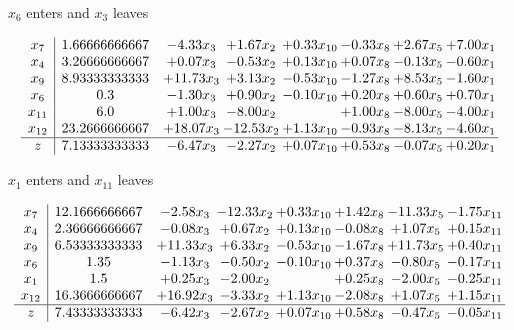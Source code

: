 \documentclass[8pt]{article}
\begin{document}
 $ x_{6} $ enters and $ x_{3} $ leaves 

 \[\begin{array}{c| c c@{\hskip 2pt} c@{\hskip 2pt} c@{\hskip 2pt} c@{\hskip 2pt} c@{\hskip 2pt} c@{\hskip 2pt} }
 x_{7}   &  1.66666666667 & -4.33 x_{3} & +  1.67 x_{2} & +  0.33 x_{10} & -0.33 x_{8} & +  2.67 x_{5} & +  7.00 x_{1}\\
 x_{4}   &  3.26666666667 & +  0.07 x_{3} & -0.53 x_{2} & +  0.13 x_{10} & +  0.07 x_{8} & -0.13 x_{5} & -0.60 x_{1}\\
 x_{9}   &  8.93333333333 & + 11.73 x_{3} & +  3.13 x_{2} & -0.53 x_{10} & -1.27 x_{8} & +  8.53 x_{5} & -1.60 x_{1}\\
 x_{6}   &  0.3 & -1.30 x_{3} & +  0.90 x_{2} & -0.10 x_{10} & +  0.20 x_{8} & +  0.60 x_{5} & +  0.70 x_{1}\\
 x_{11}   &  6.0 & +  1.00 x_{3} & -8.00 x_{2} &   & +  1.00 x_{8} & -8.00 x_{5} & -4.00 x_{1}\\
 x_{12}   &  23.2666666667 & + 18.07 x_{3} & -12.53 x_{2} & +  1.13 x_{10} & -0.93 x_{8} & -8.13 x_{5} & -4.60 x_{1}\\
\hline
z    &  7.13333333333 & -6.47 x_{3} & -2.27 x_{2} & +  0.07 x_{10} & +  0.53 x_{8} & -0.07 x_{5} & +  0.20 x_{1}\\
\end{array}\]


 $ x_{1} $ enters and $ x_{11} $ leaves 

 \[\begin{array}{c| c c@{\hskip 2pt} c@{\hskip 2pt} c@{\hskip 2pt} c@{\hskip 2pt} c@{\hskip 2pt} c@{\hskip 2pt} }
 x_{7}   &  12.1666666667 & -2.58 x_{3} & -12.33 x_{2} & +  0.33 x_{10} & +  1.42 x_{8} & -11.33 x_{5} & -1.75 x_{11}\\
 x_{4}   &  2.36666666667 & -0.08 x_{3} & +  0.67 x_{2} & +  0.13 x_{10} & -0.08 x_{8} & +  1.07 x_{5} & +  0.15 x_{11}\\
 x_{9}   &  6.53333333333 & + 11.33 x_{3} & +  6.33 x_{2} & -0.53 x_{10} & -1.67 x_{8} & + 11.73 x_{5} & +  0.40 x_{11}\\
 x_{6}   &  1.35 & -1.13 x_{3} & -0.50 x_{2} & -0.10 x_{10} & +  0.37 x_{8} & -0.80 x_{5} & -0.17 x_{11}\\
 x_{1}   &  1.5 & +  0.25 x_{3} & -2.00 x_{2} &   & +  0.25 x_{8} & -2.00 x_{5} & -0.25 x_{11}\\
 x_{12}   &  16.3666666667 & + 16.92 x_{3} & -3.33 x_{2} & +  1.13 x_{10} & -2.08 x_{8} & +  1.07 x_{5} & +  1.15 x_{11}\\
\hline
z    &  7.43333333333 & -6.42 x_{3} & -2.67 x_{2} & +  0.07 x_{10} & +  0.58 x_{8} & -0.47 x_{5} & -0.05 x_{11}\\
\end{array}\]
\end{document}
